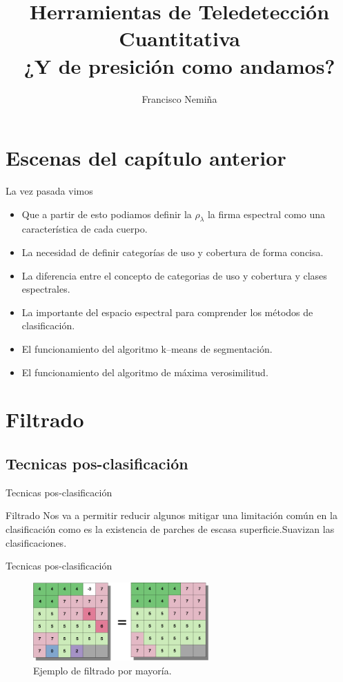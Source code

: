 \documentclass[]{beamer}
\title{Herramientas de Teledetección Cuantitativa\\{\small¿Y de presición como andamos?}}
\author{Francisco Nemiña}
\institute{Unidad de Educación y Formación Masiva \\
Comisión Nacional de Actividades Espaciales}
\begin{document}
\begin{frame}
    \maketitle
\end{frame}

\section{Escenas del capítulo anterior}
\begin{frame}{La vez pasada vimos}
  \begin{itemize}[<+->]
    \item Que a partir de esto podiamos definir la $\rho_\lambda$ la firma espectral como una característica de cada cuerpo.
    \item La necesidad de definir categorías de uso y cobertura de forma concisa.
    \item La diferencia entre el concepto de categorias de uso y cobertura y clases espectrales.
    \item La importante del espacio espectral para comprender los métodos de clasificación.
    \item El funcionamiento del algoritmo k--means de segmentación.
    \item El funcionamiento del algoritmo de máxima verosimilitud.
  \end{itemize}
\end{frame}

\section{Filtrado}
\subsection{Tecnicas pos-clasificación}

\begin{frame}{Tecnicas pos-clasificación}
  \begin{block}{Filtrado}
    Nos va a permitir reducir algunos mitigar una limitación común en la clasificación como es la existencia de parches de escasa superficie.\pause  Suavizan las clasificaciones.
  \end{block}
\end{frame}

\begin{frame}{Tecnicas pos-clasificación}
  \begin{figure}
    \includegraphics[width=0.6\textwidth]{imagenes/filter.png}
    \caption{Ejemplo de filtrado por mayoría.}
  \end{figure}
\end{frame}
\end{document}
